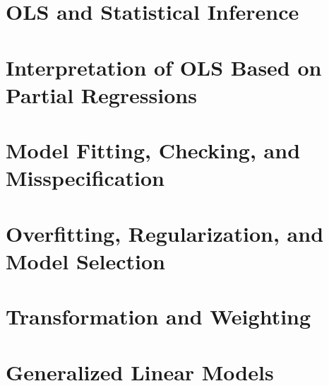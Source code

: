 \documentclass[krantz2]{krantz}
\begin{document}
 
  
\part{OLS and Statistical Inference}

  
  
 
  
  
  
  \part{Interpretation of OLS Based on Partial Regressions}\label{part::FWL-Cochran}
  
    
  
  


\part{Model Fitting, Checking, and Misspecification}
  
    
  
  
  
\part{Overfitting, Regularization, and Model Selection}\label{part::modelselection}
      
  



\part{Transformation and Weighting}
   
      
            
         

    
    \part{Generalized Linear Models}
 
     
           
     
          
       
\end{document}

